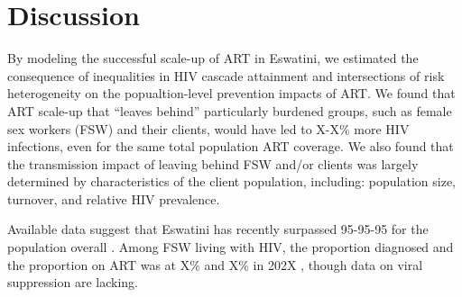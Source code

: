 \section{Discussion}\label{art.disc}
By modeling the successful scale-up of ART in Eswatini, we
estimated the consequence of inequalities in HIV cascade attainment and intersections of risk heterogeneity on
the popualtion-level prevention impacts of ART.
We found that ART scale-up that ``leaves behind'' particularly burdened groups,
such as female sex workers (FSW) and their clients, would have led to X-X\% more HIV infections,
even for the same total population ART coverage.
We also found that the transmission impact of
leaving behind FSW and/or clients was largely determined by
characteristics of the client population, including:
population size, turnover, and relative HIV prevalence.
\par
Available data suggest that
Eswatini has recently surpassed 95-95-95 for the population overall \cite{SHIMS3}.
Among FSW living with HIV, the proportion diagnosed and the proportion on ART was at X\% and X\% in 202X \cite{EswIBBS2022},
though data on viral suppression are lacking.
